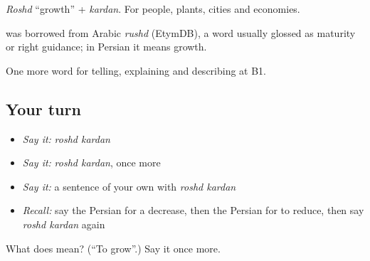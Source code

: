\emph{Roshd} \textquotedblleft{}growth\textquotedblright{} + \emph{kardan}. For people, plants, cities and economies.

\begin{cousinweb}
\textbf{} was borrowed from Arabic \emph{rushd} (EtymDB), a word usually glossed as maturity or right guidance; in Persian it means growth.
\end{cousinweb}

\begin{grammarlens}[title={What you've built}]
One more word for telling, explaining and describing at B1.
\end{grammarlens}

\subsection*{Your turn}
\begin{itemize}
\raggedright
  \item \emph{Say it:} \emph{roshd kardan}
  \item \emph{Say it:} \emph{roshd kardan}, once more
  \item \emph{Say it:} a sentence of your own with \emph{roshd kardan}
  \item \emph{Recall:} say the Persian for a decrease, then the Persian for to reduce, then say \emph{roshd kardan} again
\end{itemize}

\begin{tcolorbox}[breakable,colback=teal!4,colframe=teal!35!black,title={Before you move on}]
What does   mean? (\textquotedblleft{}To grow\textquotedblright{}.) Say it once more.
\end{tcolorbox}
